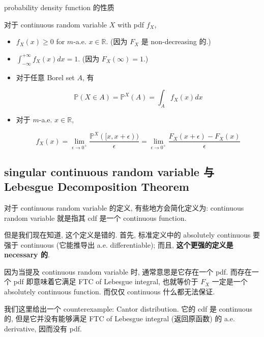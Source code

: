 \documentclass{qlnotes-export}
\begin{document}
\begin{proposition}{probability density function 的性质}\label{prop-02-random-variables-probability-density-function}

对于 continuous random variable \(X\) with pdf \(f_{X}\),

\begin{itemize}
\item
  \(f_{X}(x) \geq 0\) for \(m\)-a.e. \(x \in {\mathbb{R}}\). (因为 \(F_{X}\) 是 non-decreasing 的.)
\item
  \(\int_{- \infty}^{+ \infty}f_{X}(x) dx = 1\). (因为 \(F_{X}(\infty) = 1\).)
\item
  对于任意 Borel set \(A\), 有

  \[{\mathbb{P}}(X \in A) = {\mathbb{P}}^{X}(A) = \int_{A}f_{X}(x) dx\]
\item
  对于 \(m\)-a.e. \(x \in {\mathbb{R}}\),

  \[f_{X}(x) = \lim\limits_{\epsilon\rightarrow 0^{+}}\frac{{\mathbb{P}}^{X}(\lbrack x,x + \epsilon))}{\epsilon} = \lim\limits_{\epsilon\rightarrow 0^{+}}\frac{F_{X}(x + \epsilon) - F_{X}(x)}{\epsilon}\]
\end{itemize}

\end{proposition}

\subsection{singular continuous random variable 与 Lebesgue Decomposition Theorem}\label{singular-continuous-random-variable-ux4e0e-lebesgue-decomposition-theorem}

对于 continuous random variable 的定义, 有些地方会简化定义为: continuous random variable 就是指其 cdf 是一个 continuous function.

但是我们现在知道, 这个定义是错的. 首先, 标准定义中的 absolutely continuous 要强于 continuous (它能推导出 a.e. differentiable); 而且, \textbf{这个更强的定义是 necessary 的}.

因为当提及 continuous random variable 时, 通常意思是它存在一个 pdf. 而存在一个 pdf 即意味着它满足 FTC of Lebesgue integral, 也就等价于 \(F_{X}\) 一定是一个 absolutely continuous function. 而仅仅 continuous 什么都无法保证.

我们这里给出一个 counterexample: Cantor distribution. 它的 cdf 是 continuous 的, 但是它并没有能够满足 FTC of Lebesgue integral (返回原函数) 的 a.e. derivative, 因而没有 pdf.
\end{document}
